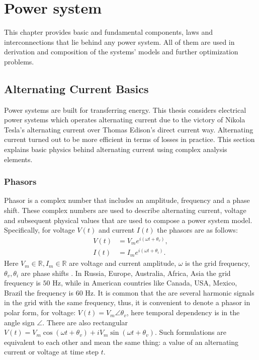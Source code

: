 \chapter{Power system}
\label{chap:power_system}
This chapter provides basic and fundamental components, laws and interconnections that lie behind any power system. All of them are used in derivation and composition of the systems' models and further optimization problems.
\section{Alternating Current Basics}

Power systems are built for transferring energy. This thesis considers electrical power systems which operates alternating current due to the victory of Nikola Tesla's alternating current over Thomas Edison's direct current way. Alternating current turned out to be more efficient in terms of losses in practice. This section explains basic physics behind alternating current using complex analysis elements.
\subsection{Phasors}

Phasor is a complex number that includes an amplitude, frequency and a phase shift. These complex numbers are used to describe alternating current, voltage and subsequent physical values that are used to compose a power system model. Specifically, for voltage $V(t)$ and current $I(t)$ the phasors are as follows:
\begin{equation}
    \begin{aligned}
        V(t) &= V_m e^{i(\omega t + \theta_v)}, \\
        I(t) &= I_m e^{i(\omega t + \theta_i)}.
    \end{aligned}
    \label{chapter_power_system:phasors}
\end{equation}
Here $V_m \in \mathbb{R}, I_m \in \mathbb{R}$ are voltage and current amplitude, $\omega$ is the grid frequency, $\theta_v, \theta_i$ are phase shifts \cite{machowski2020power}.
In Russia, Europe, Australia, Africa, Asia the grid frequency is $50$ Hz, while in American countries like Canada, USA, Mexico, Brazil the frequency is $60$ Hz. It is common that the are several harmonic signals in the grid with the same frequency, thus, it is convenient to denote a phasor in polar form, for voltage: $V(t)=V_m \angle\theta_v$, here temporal dependency is in the angle sign $\angle$. 
There are also rectangular $V(t) = V_m \cos(\omega t + \theta_v) + i V_m \sin(\omega t + \theta_v)$.
Such formulations are equivalent to each other and mean the same thing: a value of an alternating current or voltage at time step $t$. 

